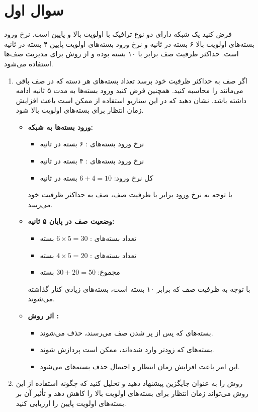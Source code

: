 \section{سوال اول}

فرض کنید یک شبکه دارای دو نوع ترافیک با اولویت بالا و پایین است. نرخ ورود بسته‌های اولویت بالا ۶ بسته در ثانیه و نرخ ورود بسته‌های اولویت پایین ۴ بسته در ثانیه است. حداکثر ظرفیت صف برابر با ۱۰ بسته بوده و از روش  برای مدیریت صف‌ها استفاده می‌شود.

\begin{enumerate}
	\item 
	اگر صف به حداکثر ظرفیت خود برسد تعداد بسته‌های هر دسته که در صف باقی می‌مانند را محاسبه کنید. همچنین فرض کنید ورود بسته‌ها به مدت ۵ ثانیه ادامه داشته باشد. نشان دهید که در این سناریو استفاده از  ممکن است باعث افزایش زمان	 انتظار برای بسته‌های اولویت بالا شود.
	
	\begin{qsolve}
		\begin{itemize}
			\item \textbf{ورود بسته‌ها به شبکه:}
			\begin{itemize}
				\item نرخ ورود بسته‌های : ۶ بسته در ثانیه
				\item نرخ ورود بسته‌های : ۴ بسته در ثانیه
				\item کل نرخ ورود: \( 6 + 4 = 10 \) بسته در ثانیه
			\end{itemize}
			با توجه به نرخ ورود برابر با ظرفیت صف، صف به حداکثر ظرفیت خود می‌رسد.
			
			\item \textbf{وضعیت صف در پایان ۵ ثانیه:}
			\begin{itemize}
				\item تعداد بسته‌های : \( 6 \times 5 = 30 \) بسته
				\item تعداد بسته‌های : \( 4 \times 5 = 20 \) بسته
				\item مجموع: \( 30 + 20 = 50 \) بسته
			\end{itemize}
			با توجه به ظرفیت صف که برابر ۱۰ بسته است، بسته‌های زیادی کنار گذاشته می‌شوند.
			
			\item \textbf{اثر روش :}
			\begin{itemize}
				\item بسته‌های  که پس از پر شدن صف می‌رسند، حذف می‌شوند.
				\item بسته‌های  که زودتر وارد شده‌اند، ممکن است پردازش شوند.
				\item این امر باعث افزایش زمان انتظار و احتمال حذف بسته‌های  می‌شود.
			\end{itemize}
		\end{itemize}
	\end{qsolve}
	
	
	\item 
	روش  را به عنوان جایگزین پیشنهاد دهید و تحلیل کنید که چگونه استفاده از این روش می‌تواند زمان انتظار برای بسته‌های اولویت بالا را کاهش دهد و تأثیر آن بر بسته‌های اولویت پایین را ارزیابی کنید.	
\end{enumerate}
\newpage


